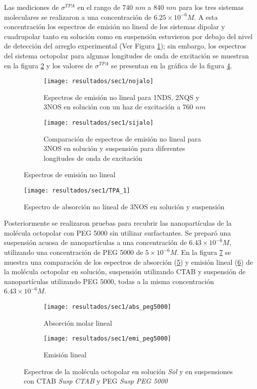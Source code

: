 Las mediciones de $\sigma^{TPA}$ en el rango de 740 $nm$ a 840 $nm$ para los tres sistemas moleculares se realizaron a una concentraci\'on de $6.25\times 10^{-6} M$. A esta concentraci\'on los espectros de emisi\'on no lineal de los sistemas dipolar y cuadrupolar tanto en soluci\'on como en suspensi\'on estuvieron por debajo del nivel de detecci\'on del arreglo experimental (Ver Figura \ref{nel}); sin embargo, los espectros del sistema octopolar para algunas longitudes de onda de excitaci\'on se muestran en la figura \ref{sip} y los valores de $\sigma^{TPA}$ se presentan en la gr\'afica de la figura \ref{tpaprimeros}.

\begin{figure}
\centering
\begin{subfigure}{\textwidth}
\centering
\texttt{[image: resultados/sec1/nojalo]}
\caption{Espectros de emisi\'on no lineal para 1NDS, 2NQS y 3NOS en soluci\'on con un haz de excitaci\'on a 760 $nm$ }\label{nel}
\end{subfigure}
\begin{subfigure}{\textwidth}
\centering
\texttt{[image: resultados/sec1/sijalo]}
\caption{Comparaci\'on de espectros de emisi\'on no lineal para 3NOS en soluci\'on y suspensi\'on para diferentes longitudes de onda de excitaci\'on }\label{sip}
\end{subfigure}
\caption{Espectros de emisi\'on no lineal}
\label{ghghh}
\end{figure}

\begin{figure}[h]
\centering
\texttt{[image: resultados/sec1/TPA\_1]}
\caption{Espectro de absorci\'on no lineal de 3NOS en soluci\'on y suspensi\'on}\label{tpaprimeros}
\end{figure}

Posteriormente se realizaron pruebas para recubrir las nanopart\'iculas de la mol\'ecula octopolar con PEG 5000 sin utilizar surfactantes. Se prepar\'o una suspensi\'on acuosa de nanopart\'iculas a una concentraci\'on de $6.43 \times 10^{-6}M$, utilizando una concentraci\'on de PEG 5000 de $5\times 10^{-6} M$. En la figura \ref{grr} se muestra una comparaci\'on de los espectros de absorci\'on (\ref{abspeg1}) y emisi\'on lineal (\ref{emipeg1}) de la mol\'ecula octopolar en soluci\'on, suspensi\'on utilizando CTAB y suspensi\'on de nanopart\'iculas utilizando PEG 5000, todas a la misma concentraci\'on $6.43 \times 10^{-6}M$. 

\begin{figure}
\centering
\begin{subfigure}{0.5\textwidth}
\centering
\texttt{[image: resultados/sec1/abs\_peg5000]}
\caption{Absorci\'on molar lineal }\label{abspeg1}
\end{subfigure}
\begin{subfigure}{0.49\textwidth}
\centering
\texttt{[image: resultados/sec1/emi\_peg5000]}
\caption{Emisi\'on lineal }\label{emipeg1}
\end{subfigure}
\caption{Espectros de la mol\'ecula octopolar en soluci\'on \emph{Sol} y  en suspensiones con CTAB \emph{Susp CTAB} y PEG \emph{Susp PEG 5000}}
\label{grr}
\end{figure}

